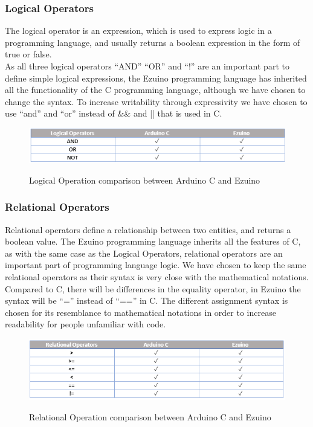 \subsubsection*{Logical Operators}
The logical operator is an expression, which is used to express logic in a programming language, and usually returns a boolean expression in the form of true or false. \\
As all three logical operators “AND” “OR” and “!” are an important part to define simple logical expressions, the Ezuino programming language has inherited all the functionality of the C programming language, although we have chosen to change the syntax. To increase writability through expressivity we have chosen to use “and” and “or” instead of \&\& and || that is used in C.\\
\begin{figure}[H]
\centering
\caption{Logical Operation comparison between Arduino C and Ezuino}
\includegraphics[scale=0.80]{figures/language_features/langf03.png}
\label{lf03}
\end{figure}
\subsubsection*{Relational Operators}
Relational operators define a relationship between two entities, and returns a boolean value.
The Ezuino programming language inherits all the features of C, as with the same case as the Logical Operators, relational operators are an important part of programming language logic. We have chosen to keep the same relational operators as their syntax is very close with the mathematical notations. Compared to C, there will be differences in the equality operator, in Ezuino the syntax will be “=” instead of “==” in C. The different assignment syntax is chosen for its resemblance to mathematical notations in order to increase readability for people unfamiliar with code.
\begin{figure}[H]
\centering
\caption{Relational Operation comparison between Arduino C and Ezuino}
\includegraphics[scale=0.80]{figures/language_features/langf04.png}
\label{lf04}
\end{figure}

